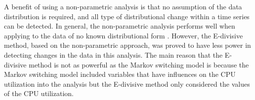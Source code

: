 A benefit of using a non-parametric analysis is that no assumption
of the data distribution is required, and all type of distributional
change within a time series can be detected. In general, the non-parametric
analysis performs well when applying to the data of no known distributional
form \citep{sharkey2014nonparametric}. However, the E-divisive method,
based on the non-parametric approach, was proved to have less power
in detecting changes in the data in this analysis. The main reason
that the E-divisive method is not as powerful as the Markov switching
model is because the Markov switching model included variables that
have influences on the CPU utilization into the analysis but the E-divisive
method only considered the values of the CPU utilization. %
\begin{comment}
Note that when the Markov switching model was performed, variables
that have influences on the CPU utilization were also included in
the model. On the other hand, the E-divisive method only considered
the values of the CPU utilization. With this difference, the E-divisive
method will have less power to identify actual changes in the CPU
utilization. Since there are other variables that affect the value
of the CPU utilization, it is insufficient to take into account only
the response variable.
\end{comment}
{} %
\begin{comment}
The E-divisive method appears to perform reasonably well in detecting
changes as far as a non-parametric analysis could. As can be seen
from \ref{subsec:Real-data}, the method is able to detect when a
change is happened around the same time as the Markov switching model
did. Even though the E-divisive method might not provide the best
result, it can give a general idea of estimated change points.
\end{comment}

